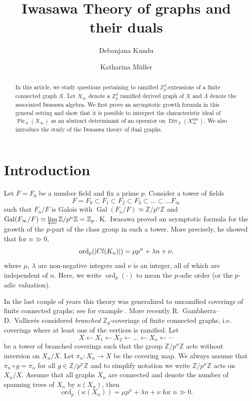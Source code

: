 \documentclass{amsart}
\title[]{Iwasawa Theory of graphs and their duals}
\author[D.~Kundu]{Debanjana Kundu}
\author[K.~M\"uller]{Katharina M\"uller}
\numberwithin{equation}{section}
\theoremstyle{remark}
\newcommand{\Div}{\operatorname{Div}}
\newcommand{\Pic}{\operatorname{Pic}}
\newcommand{\Gal}{\operatorname{Gal}}
\newcommand{\ord}{\operatorname{ord}}
\newcommand{\unr}{\operatorname{unr}}
\newcommand{\Z}{\mathbb{Z}}
\theoremstyle{plain} %
\begin{document}
\begin{abstract}
In this article, we study questions pertaining to ramified $\Z_p^d$-extensions of a finite connected graph $X$.
{
Let $X_\infty$ denote a $\Z_p^d$ ramified derived graph of $X$ and $\Lambda$ denote the associated Iwasawa algebra.
We first prove an asymptotic growth formula in this general setting and show that it is possible to interpret the characteristic ideal of $\Pic_{\Lambda}(X_\infty)$ as an abstract determinant of an operator on $\Div_{\Lambda}(X_\infty^{\unr})$.}
We also {introduce the} study {of} the Iwasawa theory of dual graphs.
\end{abstract}

\maketitle

\section{Introduction}
Let $F=F_0$ be a number field and fix a prime $p$.
Consider a tower of fields
\[
F=F_0 \subset F_1\subset F_2\subset F_3\subset \dots \subset \dots F_\infty
\]
such that $F_n/F$ is Galois with $\Gal(F_n/F)\simeq \Z/p^n\Z$ and $\Gal(F_\infty/F) \simeq \varprojlim \Z/p^n\Z = \Z_p$.
K.~Iwasawa proved an asymptotic formula for the growth of the $p$-part of the class group in such a tower.
More precisely, he showed that for $n\gg 0$,
\[
{\ord_p}(\vert \textup{Cl}(K_n)\vert)=\mu p^n+\lambda n+\nu,
\]
where $\mu$, $\lambda$ are non-negative integers and $\nu$ is an integer, all of which are independent of $n$.
{Here, we write $\ord_p(\cdot)$ to mean the $p$-adic order (or the $p$-adic valuation).}

In the last couple of years this theory was generalized to unramified coverings of finite connected graphs; see for example \cite{gonet2022iwasawa, Val21, dubose-vallieres, kataoka2023fitting, kleine2023non, MV23, MV24, DLRV_Nagoya, Kleine-Mueller4}.
More recently R.~Gambherra--D.~Vallierés \cite{GV24} considered \textit{branched} $\Z_p$-coverings of finite connected graphs, i.e. coverings where at least one of the vertices is ramified.
Let
\[
X \longleftarrow X_1 \longleftarrow X_2 \longleftarrow \dots \longleftarrow X_n \longleftarrow \cdots
\]
be a tower of branched coverings such that the group $\Z/p^n\Z$ acts without inversion on $X_n/X$. 
{Let $\pi_n\colon X_n\to X$ be the covering map.
We always assume that $\pi_n\circ g=\pi_n$ for all $g\in \Z/p^n\Z$ and to simplify notation we write $\Z/p^n\Z$ acts on $X_n/X$. }
Assume that all graphs $X_n$ are connected and denote the number of spanning trees of $X_n$ by $\kappa(X_n)$, then
\[
\ord_p(\kappa(X_n))=\mu p^n +\lambda n+\nu \text{ for } n\gg 0.
\]
 
\end{document}
